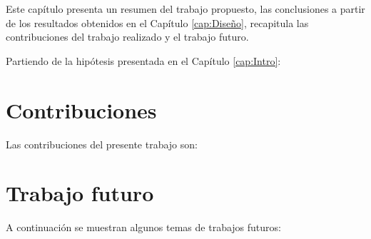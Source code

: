 Este capítulo presenta un resumen del trabajo propuesto, las conclusiones a partir de los resultados obtenidos en el Capítulo \ref{cap:Diseño}, recapitula las contribuciones del trabajo realizado y el trabajo futuro.



\vspace{0.3cm}

Partiendo de la hipótesis presentada en el Capítulo \ref{cap:Intro}:





\section{Contribuciones}

Las contribuciones del presente trabajo son:

\begin{itemize}
	
\end{itemize}

\section{Trabajo futuro}

A continuación se muestran algunos temas de trabajos futuros:

\begin{itemize}

\end{itemize}

